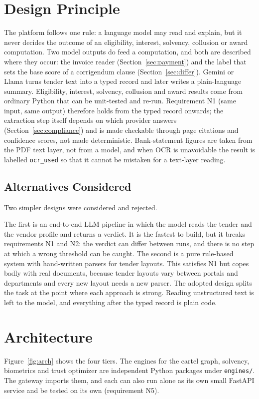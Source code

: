 \section{Design Principle}
The platform follows one rule: a language model may read and explain, but it never decides the outcome of an eligibility, interest, solvency, collusion or award computation. Two model outputs do feed a computation, and both are described where they occur: the invoice reader (Section~\ref{sec:payment}) and the label that sets the base score of a corrigendum clause (Section~\ref{sec:differ}). Gemini or Llama turns tender text into a typed record and later writes a plain-language summary. Eligibility, interest, solvency, collusion and award results come from ordinary Python that can be unit-tested and re-run. Requirement N1 (same input, same output) therefore holds from the typed record onwards; the extraction step itself depends on which provider answers (Section~\ref{sec:compliance}) and is made checkable through page citations and confidence scores, not made deterministic. Bank-statement figures are taken from the PDF text layer, not from a model, and when OCR is unavoidable the result is labelled \texttt{ocr\_used} so that it cannot be mistaken for a text-layer reading.

\subsection{Alternatives Considered}
Two simpler designs were considered and rejected.

The first is an end-to-end LLM pipeline in which the model reads the tender and the vendor profile and returns a verdict. It is the fastest to build, but it breaks requirements N1 and N2: the verdict can differ between runs, and there is no step at which a wrong threshold can be caught. The second is a pure rule-based system with hand-written parsers for tender layouts. This satisfies N1 but copes badly with real documents, because tender layouts vary between portals and departments and every new layout needs a new parser. The adopted design splits the task at the point where each approach is strong. Reading unstructured text is left to the model, and everything after the typed record is plain code.

\section{Architecture}
\label{sec:arch}
Figure~\ref{fig:arch} shows the four tiers. The engines for the cartel graph, solvency, biometrics and trust optimizer are independent Python packages under \texttt{engines/}. The gateway imports them, and each can also run alone as its own small FastAPI service and be tested on its own (requirement N5).

